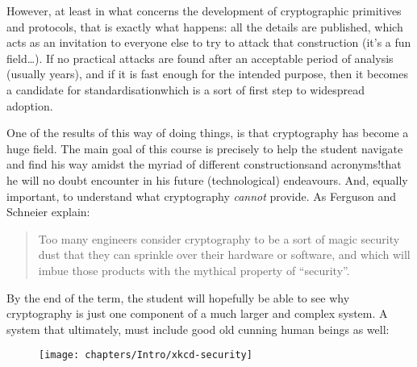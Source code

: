   However, at least in what concerns the development of cryptographic primitives and protocols, that is exactly what happens: all the details are published, which acts as an invitation to everyone else to try to attack that construction (it's a fun field\dots). If no practical attacks are found after an acceptable period of analysis (usually years), and if it is fast enough for the intended purpose, then it becomes a candidate for standardisation\emd which is a sort of first step to widespread adoption.

  One of the results of this way of doing things, is that cryptography has become a huge field. The main goal of this course is precisely to help the student navigate and find his way amidst the myriad of different constructions\emd and acronyms!\emd that he will no doubt encounter in his future (technological) endeavours. And, equally important, to understand what cryptography \emph{cannot} provide. As Ferguson and Schneier explain:
  \begin{quotation}
    \noindent Too many engineers consider cryptography to be a sort of magic security dust that they can sprinkle over their hardware or software, and which will imbue those products with the mythical property of ``security''.
  \end{quotation}
  By the end of the term, the student will hopefully be able to see why cryptography is just one component of a much larger and complex system. A system that ultimately, must include good old cunning human beings as well:
  \begin{figure}[h!]
    \centering
    \texttt{[image: chapters/Intro/xkcd-security]}
    \label{fig:xkcd_security}
  \end{figure}


